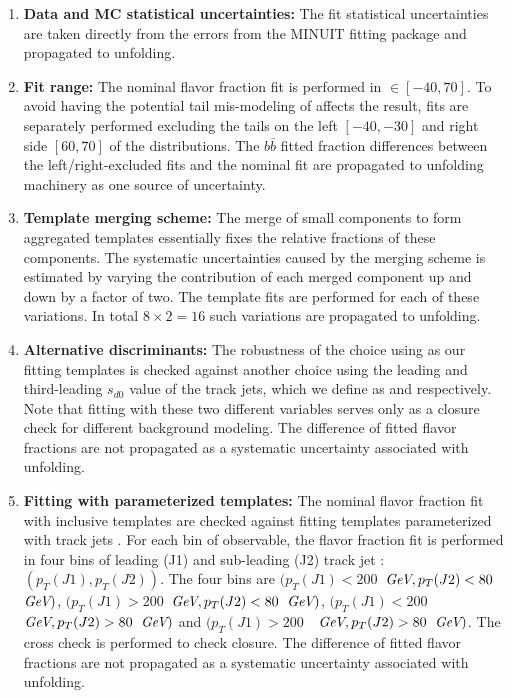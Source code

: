 \begin{enumerate}
  \item \textbf{Data and MC statistical uncertainties:} The fit statistical uncertainties are taken directly from the errors from the MINUIT fitting package and propagated to unfolding.
  \item \textbf{Fit range:} The nominal flavor fraction fit is performed in \subsdzero$\in[-40, 70]$. To avoid having the potential tail mis-modeling of \subsdzero affects the result, fits are separately performed excluding the tails on the left $[-40, -30]$ and right side $[60, 70]$ of the \subsdzero distributions. The $b\bar b$ fitted fraction differences between the left/right-excluded fits and the nominal fit are propagated to unfolding machinery as one source of uncertainty. 
  \item \textbf{Template merging scheme:} The merge of small components to form aggregated templates essentially fixes the relative fractions of these components. The systematic uncertainties caused by the merging scheme is estimated by varying the contribution of each merged component up and down by a factor of two. The template fits are performed for each of these variations. In total $8\times 2 =16$ such variations are propagated to unfolding.
  \item \textbf{Alternative discriminants:} The robustness of the choice using \subsdzero as our fitting templates is checked against another choice using the leading and third-leading $s_{d0}$ value of the track jets, which we define as \sdzero and \subsubsdzero respectively. Note that fitting with these two different variables serves only as a closure check for different background modeling. The difference of fitted flavor fractions are not propagated as a systematic uncertainty associated with unfolding.
  \item \textbf{Fitting with \pt parameterized templates:} The nominal flavor fraction fit with inclusive \subsdzero templates are checked against fitting templates parameterized with track jets \pt. For each bin of observable, the flavor fraction fit is performed in four bins of leading (J1) and sub-leading (J2) track jet \pt: $(p_T(J1), p_T(J2))$. The four bins are $(p_T(J1)<200$~$\textit{GeV}, p_T(J2)<80$~$\textit{GeV})$, $(p_T(J1)>200$~$\textit{GeV}, p_T(J2)<80$~$\textit{GeV})$, $(p_T(J1)<200$~$\textit{GeV}, p_T(J2)>80$~$\textit{GeV})$ and $(p_T(J1)>200$~~$\textit{GeV}, p_T(J2)>80$~$\textit{GeV})$. The cross check is performed to check closure. The difference of fitted flavor fractions are not propagated as a systematic uncertainty associated with unfolding.

\end{enumerate}
